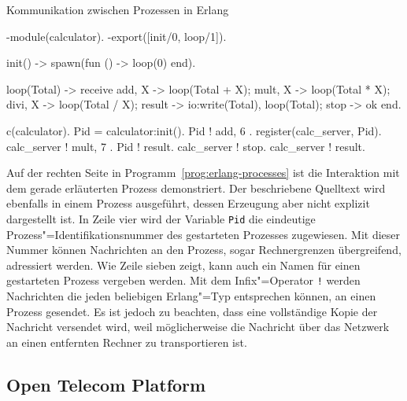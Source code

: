 \begin{program}[!hbt]
\caption{Kommunikation zwischen Prozessen in Erlang}
\label{prog:erlang-processes}
\noindent\begin{minipage}[t]{.52\textwidth}
\lstset{showlines=true}
\begin{ErlangCode}
-module(calculator).
-export([init/0, loop/1]).

init() ->
  spawn(fun () -> loop(0) end).

loop(Total) ->
  receive
    { add,  X } -> loop(Total + X);
    { mult, X } -> loop(Total * X);
		{ divi, X } -> loop(Total / X);
    result      -> io:write(Total),
									 loop(Total);
    stop    		-> ok
  end.
\end{ErlangCode}

\end{minipage}\hfill
\begin{minipage}[t]{.44\textwidth}
\lstset{showlines=true}
\begin{ErlangCode}
c(calculator).
Pid = calculator:init().
Pid ! { add, 6 }.
register(calc_server, Pid).
calc_server ! { mult, 7 }.
Pid ! result. %
calc_server ! stop.
calc_server ! result.
\end{ErlangCode}

\end{minipage}
\end{program}

Auf der rechten Seite in Programm~\ref{prog:erlang-processes} ist die Interaktion mit dem gerade erläuterten Prozess demonstriert. Der beschriebene Quelltext wird ebenfalls in einem Prozess ausgeführt, dessen Erzeugung aber nicht explizit dargestellt ist. In Zeile vier wird der Variable \lstinline{Pid} die eindeutige Prozess"=Identifikationsnummer des gestarteten Prozesses zugewiesen. Mit dieser Nummer können Nachrichten an den Prozess, sogar Rechnergrenzen übergreifend, adressiert werden. Wie Zeile sieben zeigt, kann auch ein Namen für einen gestarteten Prozess vergeben werden. Mit dem Infix"=Operator \lstinline{!} werden Nachrichten die jeden beliebigen Erlang"=Typ entsprechen können, an einen Prozess gesendet. Es ist jedoch zu beachten, dass eine vollständige Kopie der Nachricht versendet wird, weil möglicherweise die Nachricht  über das Netzwerk an einen entfernten Rechner zu transportieren ist.

\subsection{Open Telecom Platform}

